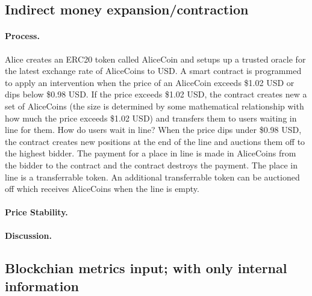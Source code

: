 \subsection{Indirect money expansion/contraction}

\paragraph{Process.} Alice creates an ERC20 token called AliceCoin and setups up a trusted oracle for the latest exchange rate of AliceCoins to USD. A smart contract is programmed to apply an intervention when the price of an AliceCoin exceeds \$1.02 USD or dips below \$0.98 USD.  If the price exceeds \$1.02 USD, the contract creates new a set of AliceCoins (the size is determined by some mathematical relationship with how much the price exceeds \$1.02 USD) and transfers them to users waiting in line for them. How do users wait in line? When the price dips under \$0.98 USD, the contract creates new positions at the end of the line and auctions them off to the highest bidder. The payment for a place in line is made in AliceCoins from the bidder to the contract and the contract destroys the payment. The place in line is a transferrable token. An additional transferrable token can be auctioned off which receives AliceCoins when the line is empty.


\paragraph{Price Stability.}

\paragraph{Discussion.}


\subsection{Blockchian metrics input; with only internal information}


